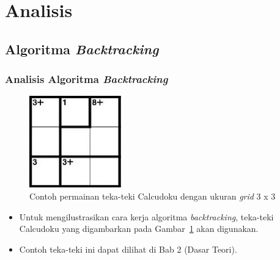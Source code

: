 \documentclass{beamer}
\begin{document}

\section{Analisis}

\subsection{Algoritma \protect\textit{Backtracking}}

\begin{frame}
\frametitle{Analisis Algoritma \textit{Backtracking}}
\begin{figure}
\centering
\captionsetup{justification=centering}
\includegraphics[scale=1]{Gambar/Backtracking4}
\caption[Contoh permainan teka-teki Calcudoku dengan ukuran \textit{grid} 3 x 3]{Contoh permainan teka-teki Calcudoku dengan ukuran \textit{grid} 3 x 3}
\label{fig:backtracking4}
\end{figure}
\begin{itemize}
\item Untuk mengilustrasikan cara kerja algoritma \textit{backtracking}, teka-teki Calcudoku yang digambarkan pada Gambar~\ref{fig:backtracking4} akan digunakan.
\item Contoh teka-teki ini dapat dilihat di Bab 2 (Dasar Teori).
\end{itemize}
\end{frame}

\end{document}
